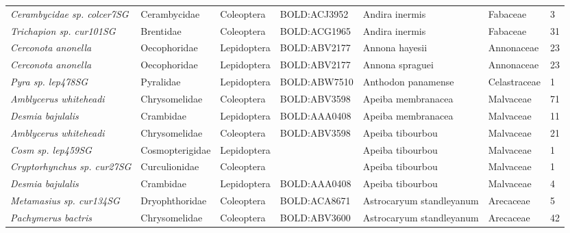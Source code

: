 \documentclass[11pt]{article}
\begin{document}
\begin{landscape}
\begin{longtable}{@{}lllllll@{}}
\textit{Cerambycidae sp. colcer7SG}                   & Cerambycidae    & Coleoptera   & BOLD:ACJ3952 & Andira inermis                     & Fabaceae         & 3     \\
\textit{Trichapion sp. cur101SG}                      & Brentidae       & Coleoptera   & BOLD:ACG1965 & Andira inermis                     & Fabaceae         & 31    \\
\textit{Cerconota anonella}                           & Oecophoridae    & Lepidoptera  & BOLD:ABV2177 & Annona hayesii                     & Annonaceae       & 23    \\
\textit{Cerconota anonella}                           & Oecophoridae    & Lepidoptera  & BOLD:ABV2177 & Annona spraguei                    & Annonaceae       & 23    \\
\textit{Pyra sp. lep478SG}                            & Pyralidae       & Lepidoptera  & BOLD:ABW7510 & Anthodon panamense                 & Celastraceae     & 1     \\
\textit{Amblycerus whiteheadi}                        & Chrysomelidae   & Coleoptera   & BOLD:ABV3598 & Apeiba membranacea                 & Malvaceae        & 71    \\
\textit{Desmia bajulalis}                             & Crambidae       & Lepidoptera  & BOLD:AAA0408 & Apeiba membranacea                 & Malvaceae        & 11    \\
\textit{Amblycerus whiteheadi}                        & Chrysomelidae   & Coleoptera   & BOLD:ABV3598 & Apeiba tibourbou                   & Malvaceae        & 21    \\
\textit{Cosm sp. lep459SG}                            & Cosmopterigidae & Lepidoptera  &              & Apeiba tibourbou                   & Malvaceae        & 1     \\
\textit{Cryptorhynchus sp. cur27SG}                   & Curculionidae   & Coleoptera   &              & Apeiba tibourbou                   & Malvaceae        & 1     \\
\textit{Desmia bajulalis}                             & Crambidae       & Lepidoptera  & BOLD:AAA0408 & Apeiba tibourbou                   & Malvaceae        & 4     \\
\textit{Metamasius sp. cur134SG}                      & Dryophthoridae  & Coleoptera   & BOLD:ACA8671 & Astrocaryum standleyanum           & Arecaceae        & 5     \\
\textit{Pachymerus bactris}                           & Chrysomelidae   & Coleoptera   & BOLD:ABV3600 & Astrocaryum standleyanum           & Arecaceae        & 42    \\

\end{longtable}
\end{landscape}
\end{document}

